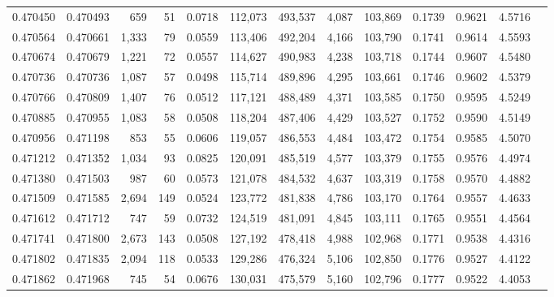 \begin{tabular}{rrrrrrrrrrrrr}
0.470450 & 0.470493 &   659 &    51 &                                     0.0718 & 112,073 & 493,537 &   4,087 & 103,869 & 0.1739 & 0.9621 & 4.5716 \\
0.470564 & 0.470661 & 1,333 &    79 &                                     0.0559 & 113,406 & 492,204 &   4,166 & 103,790 & 0.1741 & 0.9614 & 4.5593 \\
0.470674 & 0.470679 & 1,221 &    72 &                                     0.0557 & 114,627 & 490,983 &   4,238 & 103,718 & 0.1744 & 0.9607 & 4.5480 \\
0.470736 & 0.470736 & 1,087 &    57 &                                     0.0498 & 115,714 & 489,896 &   4,295 & 103,661 & 0.1746 & 0.9602 & 4.5379 \\
0.470766 & 0.470809 & 1,407 &    76 &                                     0.0512 & 117,121 & 488,489 &   4,371 & 103,585 & 0.1750 & 0.9595 & 4.5249 \\
0.470885 & 0.470955 & 1,083 &    58 &                                     0.0508 & 118,204 & 487,406 &   4,429 & 103,527 & 0.1752 & 0.9590 & 4.5149 \\
0.470956 & 0.471198 &   853 &    55 &                                     0.0606 & 119,057 & 486,553 &   4,484 & 103,472 & 0.1754 & 0.9585 & 4.5070 \\
0.471212 & 0.471352 & 1,034 &    93 &                                     0.0825 & 120,091 & 485,519 &   4,577 & 103,379 & 0.1755 & 0.9576 & 4.4974 \\
0.471380 & 0.471503 &   987 &    60 &                                     0.0573 & 121,078 & 484,532 &   4,637 & 103,319 & 0.1758 & 0.9570 & 4.4882 \\
0.471509 & 0.471585 & 2,694 &   149 &                                     0.0524 & 123,772 & 481,838 &   4,786 & 103,170 & 0.1764 & 0.9557 & 4.4633 \\
0.471612 & 0.471712 &   747 &    59 &                                     0.0732 & 124,519 & 481,091 &   4,845 & 103,111 & 0.1765 & 0.9551 & 4.4564 \\
0.471741 & 0.471800 & 2,673 &   143 &                                     0.0508 & 127,192 & 478,418 &   4,988 & 102,968 & 0.1771 & 0.9538 & 4.4316 \\
0.471802 & 0.471835 & 2,094 &   118 &                                     0.0533 & 129,286 & 476,324 &   5,106 & 102,850 & 0.1776 & 0.9527 & 4.4122 \\
0.471862 & 0.471968 &   745 &    54 &                                     0.0676 & 130,031 & 475,579 &   5,160 & 102,796 & 0.1777 & 0.9522 & 4.4053 \\

\end{tabular}
